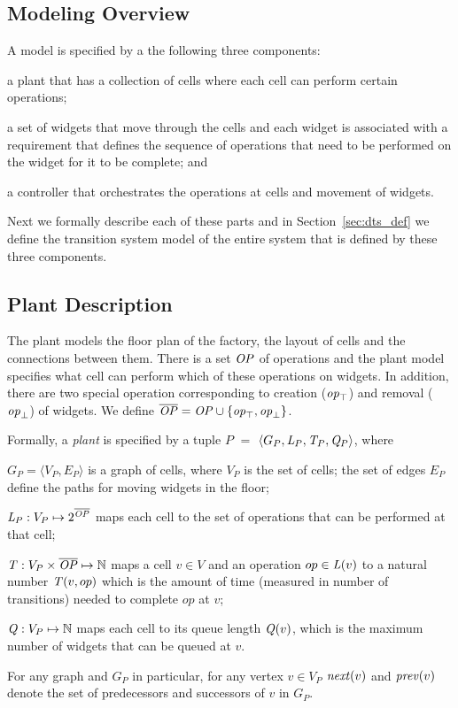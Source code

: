 \subsection{\mfname Modeling Overview}
\label{sec:model}

A \mfname model is specified by a the following three components: 
\begin{enumerate*}[label=(\roman*)]
	\item a plant that has a collection of cells where each cell can perform certain operations;
	\item  a set of widgets that move  through the cells and each widget is associated with a requirement that defines the sequence of operations that need to be performed on the widget for it to be complete; and
	\item a controller that orchestrates  the operations at cells and movement of widgets.
\end{enumerate*}
Next we formally describe each of these parts and in Section~\ref{sec:dts_def} we define the transition system model of the entire system that is defined by these three components.

 	
\subsection{Plant Description}
The plant models the floor plan of the factory, the layout of cells and the connections between them. There is a set $\mathit{OP}$ of operations and the plant model specifies what cell can perform which of these operations on widgets. 
In addition, there are two special operation corresponding to creation ($\mathit{op}_\top$) and removal ($\mathit{op}_\bot$) of widgets. 
We define $\overline{\mathit{OP}} = \mathit{OP} \cup \{\mathit{op}_\top,\mathit{op}_\bot\}$.


Formally, a  {\em plant\/} is specified by a tuple $P $ $=$ $\langle G_P, \mathit{L}_P{}, \mathit{T}_P{}, \mathit{Q}_P{} \rangle$, 
    where 
    \begin{enumerate*}[label=(\roman*)]
      \item $G_P = \langle V_P,E_P \rangle$  is a graph of cells, where $V_P$ is the set of cells; the set of edges $E_P$ define the paths for moving widgets in the floor; 
      \item $\mathit{L}_P{}: V_P \mapsto 2^{\overline{\mathit{OP}}}$ maps each cell to the set  of operations that can be performed at that cell;
      \item $\mathit{T}{}: V_P \times \overline{\mathit{OP}} \mapsto \mathbb{N}$ maps a cell $v \in V$ and an operation $op \in \mathit{L}(v)$ to a natural number $\mathit{T}{(v,op)}$ which is the amount of time (measured in number of transitions) needed to complete $op$ at $v$; 
      \item $\mathit{Q}{}: V_P \mapsto \mathbb{N}$ maps each cell to its queue length $\mathit{Q}{(v)}$, which is the maximum number of widgets that can be queued at $v$.
    \end{enumerate*}
For any graph and $G_P$ in particular, for any vertex $v \in V_P$
 ${\mathit{next}}(v)$ and $\mathit{prev}(v)$ denote the set of predecessors and successors of $v$ in $G_P$. 
 
